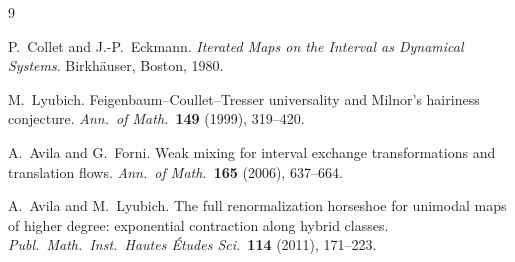 \documentclass[11pt]{article}
\begin{document}
\begin{thebibliography}{9}

P.~Collet and J.-P.~Eckmann.
\emph{Iterated Maps on the Interval as Dynamical Systems}.
Birkh\"{a}user, Boston, 1980.

M.~Lyubich.
Feigenbaum--Coullet--Tresser universality and Milnor's hairiness conjecture.
\emph{Ann.\ of Math.}\ \textbf{149} (1999), 319--420.

A.~Avila and G.~Forni.
Weak mixing for interval exchange transformations and translation flows.
\emph{Ann.\ of Math.}\ \textbf{165} (2006), 637--664.

A.~Avila and M.~Lyubich.
The full renormalization horseshoe for unimodal maps of higher degree:
exponential contraction along hybrid classes.
\emph{Publ.\ Math.\ Inst.\ Hautes \'Etudes Sci.}\ \textbf{114} (2011),
171--223.

\end{thebibliography}
\end{document}
